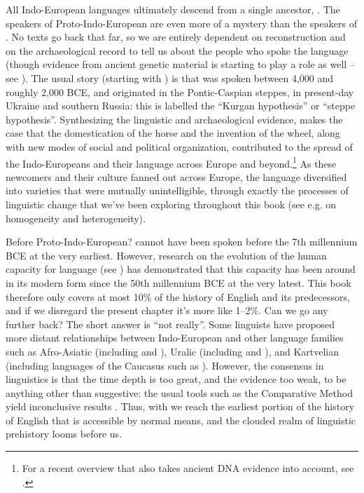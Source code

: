 All Indo-European languages ultimately descend from a single ancestor, . The speakers of Proto-Indo-European are even more of a mystery than the speakers of . No texts go back that far, so we are entirely dependent on reconstruction and on the archaeological record to tell us about the people who spoke the language (though evidence from ancient genetic material is starting to play a role as well -- see \citealt{Haak2015}). The usual story (starting with \citealp{Gimbutas1970}) is that  was spoken between 4,000 and roughly 2,000 BCE, and originated in the Pontic-Caspian steppes, in present-day Ukraine and southern Russia: this is labelled the ``Kurgan hypothesis'' or ``steppe hypothesis''. Synthesizing the linguistic and archaeological evidence, \citet{Anthony2007} makes the case that the domestication of the horse and the invention of the wheel, along with new modes of social and political organization, contributed to the spread of the Indo-Europeans and their language across Europe and beyond.\footnote{For a recent overview that also takes ancient DNA evidence into account, see \citet{Anthony2019}.} As these newcomers and their culture fanned out across Europe, the language diversified into varieties that were mutually unintelligible, through exactly the processes of linguistic change that we've been exploring throughout this book (see e.g.  on homogeneity and heterogeneity).


\begin{varietybox}{Before Proto-Indo-European?}
 cannot have been spoken before the 7th millennium BCE at the very earliest. However, research on the evolution of the human capacity for language (see \citealp{Fitch2010}) has demonstrated that this capacity has been around in its modern form since the 50th millennium BCE at the very latest. This book therefore only covers at most 10\% of the history of English and its predecessors, and if we disregard the present chapter it's more like 1–2\%. Can we go any further back? The short answer is ``not really''. Some linguists have proposed more distant relationships between Indo-European and other language families such as Afro-Asiatic (including  and ), Uralic (including  and ), and Kartvelian (including languages of the Caucasus such as ). However, the consensus in linguistics is that the time depth is too great, and the evidence too weak, to be anything other than suggestive: the usual tools such as the Comparative Method yield inconclusive results \citep{CampbellPoser2008}. Thus, with  we reach the earliest portion of the history of English that is accessible by normal means, and the clouded realm of linguistic prehistory looms before us.
\end{varietybox}


